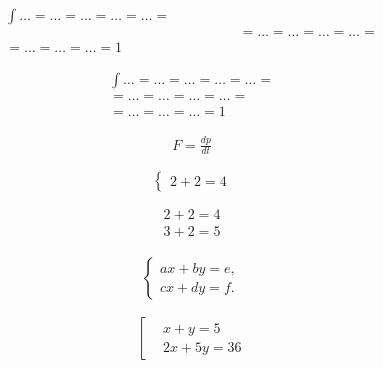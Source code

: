 \documentclass[a4paper]{article}
\begin{document}
    \begin{multline}
        \int \dots = \dots = \dots = \dots = \dots =\\
        \hspace{200pt} %
        = \dots = \dots = \dots = \dots =\\
        = \dots = \dots = \dots = 1
    \end{multline}

    \[
        \begin{split} %
            \int \dots = \dots = \dots = \dots = \dots =\\
            = \dots = \dots = \dots = \dots =\\
            = \dots = \dots = \dots = 1
        \end{split}
    \]

    \begin{align*}
        F = \frac{dp}{dt} \tag{II ЗН} %
    \end{align*}

    \[
        \begin{cases} %
            2 + 2 = 4
        \end{cases}
    \]

    \[
        \begin{aligned} %
            2 + 2 = 4\\
            3 + 2 = 5
        \end{aligned}
    \]

    \begin{align*}
        \begin{cases} %
            ax + by = e,\\
            cx + dy = f.
        \end{cases}
    \end{align*}

    \[
        \left[\begin{aligned}
            &x + y = 5\\ %
            &2x + 5y = 36 %
        \end{aligned}\right. %
    \]
\end{document}
